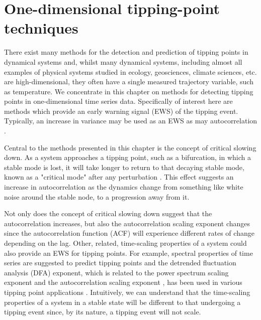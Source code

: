 
\chapter{One-dimensional tipping-point techniques}
\label{chap:1D}

\graphicspath{{Chap_1D_methods/Figs/}}

There exist many methods for the detection and prediction of tipping points in dynamical systems \citep{held2004,ditlevsen2010, lenton2012, ashwin2012,livina2012} and, whilst many dynamical systems, including almost all examples of physical systems studied in ecology, geosciences, climate sciences, etc. are high-dimensional, they often have a single measured trajectory variable, such as temperature. We concentrate in this chapter on methods for detecting tipping points in one-dimensional time series data. Specifically of interest here are methods which provide an early warning signal (EWS) of the tipping event. Typically, an increase in variance may be used as an EWS as may autocorrelation \citep{carpenter2006,dakos2008}. 

Central to the methods presented in this chapter is the concept of critical slowing down. As a system approaches a tipping point, such as a bifurcation, in which a stable mode is lost, it will take longer to return to that decaying stable mode, known as a "critical mode" after any perturbation \citep{ashwin2012}. This effect suggests an increase in autocorrelation as the dynamics change from something like white noise around the stable node, to a progression away from it. 

Not only does the concept of critical slowing down suggest that the autocorrelation increases, but also the autocorrelation scaling exponent changes since the autocorrelation function (ACF) will experience different rates of change depending on the lag. Other, related,  time-scaling properties of a system could also provide an EWS for tipping points. For example, spectral properties of time series are suggested to predict tipping points \citep{kleinen2003} and the detrended fluctuation analysis (DFA) exponent, which is related to the power spectrum scaling exponent \citep{heneghan2000} and the autocorrelation scaling exponent \citep{kantelhardt2001}, has been used in various tipping point applications \citep{livina2007,lenton2012}. Intuitively, we can understand that the time-scaling properties of a system in a stable state will be different to that undergoing a tipping event since, by its nature, a tipping event will not scale. 

